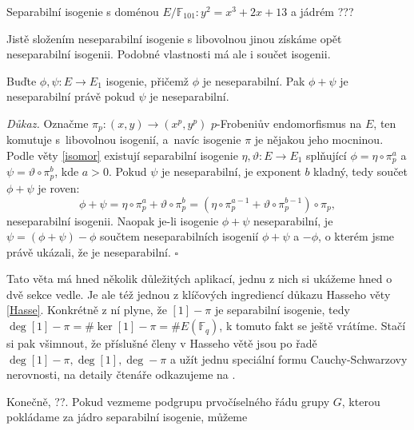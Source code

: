 \documentclass [12pt]{report}
\begin{document}
\begin{priklad}
Separabilní isogenie s doménou $E/\mathbb{F}_{101} : y^2 = x^3+2x+13$ a jádrém ???
\end{priklad}


Jistě složením neseparabilní isogenie s libovolnou jinou získáme opět neseparabilní isogenii. Podobné vlastnosti má ale i součet isogenii.
\begin{veta}\label{separsum}
Buďte $\phi,\psi : E \longrightarrow E_1$ isogenie, přičemž $\phi$ je neseparabilní. Pak $\phi+\psi$ je neseparabilní právě pokud $\psi$ je neseparabilní.
\end{veta}
\noindent \textit{Důkaz.} Označme $\pi_p : (x,y) \rightarrow (x^p,y^p)$ $p$-Frobeniův endomorfismus na $E$, ten komutuje s~libovolnou isogenií, a~navíc isogenie $\pi$ je nějakou jeho mocninou. Podle věty \ref{isomor} existují separabilní isogenie $\eta,\vartheta : E \longrightarrow E_1$ splňující $\phi =  \eta \circ \pi_p ^a$ a $\psi = \vartheta\circ \pi_p ^b$, kde $a > 0$. Pokud $\psi$ je neseparabilní, je exponent $b$ kladný, tedy součet $\phi+\psi$ je roven:
\begin{equation*}
\phi+\psi = \eta \circ \pi_p ^a +\vartheta\circ \pi_p ^b = (\eta \circ \pi_p ^{a-1} + \vartheta \circ \pi_p ^{b-1}) \circ \pi_p, 
\end{equation*}
neseparabilní isogenii. Naopak je-li isogenie $\phi+\psi$ neseparabilní, je $\psi = (\phi+\psi) - \phi$ součtem neseparabilních isogenií $\phi+\psi$ a $-\phi$, o kterém jsme právě ukázali, že je neseparabilní. \hfill $\square$\\

\begin{poznamka}
Tato věta má hned několik důležitých aplikací, jednu z nich si ukážeme hned o dvě sekce vedle. Je ale též jednou z klíčových ingrediencí důkazu Hasseho věty \ref{Hasse}. Konkrétně z ní plyne, že $[1]-\pi$ je separabilní isogenie, tedy $\deg [1]-\pi = \# \ker [1]-\pi = \# E(\mathbb{F}_q)$, k tomuto fakt se ještě vrátíme. Stačí si pak všimnout, že příslušné členy v Hasseho větě jsou po řadě $\deg [1] - \pi, \deg [1], \deg -\pi$ a užít jednu speciální formu Cauchy-Schwarzovy nerovnosti, na detaily čtenáře odkazujeme na \cite[Thm. V.1.1.]{Silverman}.
\end{poznamka}

Konečně, ??. Pokud vezmeme podgrupu prvočíselného řádu grupy $G$, kterou pokládame za jádro separabilní isogenie, můžeme
\end{document}

